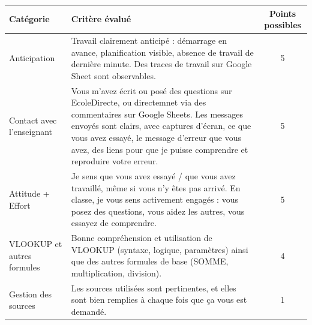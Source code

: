 \documentclass{exam}
\begin{document}
\renewcommand{\arraystretch}{1.7}
{
\centering
\begin{longtable}{|L{0.2\textwidth}|L{0.65\textwidth}|c|}
\hline
{}
\textbf{Catégorie} & \textbf{Critère évalué} & \textbf{Points possibles} \\[2pt]
\hline

Anticipation
& Travail clairement anticipé : démarrage en avance, planification visible, absence de travail de dernière minute. Des traces de travail sur Google Sheet sont observables.
& 5 \\
\hline

Contact avec l’enseignant
& Vous m'avez écrit ou posé des questions sur EcoleDirecte, ou directemnet via des commentaires sur Google Sheets. Les messages envoyés sont clairs, avec captures d'écran, ce que vous avez essayé, le message d'erreur que vous avez, des liens pour que je puisse comprendre et reproduire votre erreur.
& 5 \\
\hline

Attitude + Effort
& Je sens que vous avez essayé / que vous avez travaillé, même si vous n'y êtes pas arrivé. En classe, je vous sens activement engagés : vous posez des questions, vous aidez les autres, vous essayez de comprendre.
& 5 \\
\hline

VLOOKUP et autres formules
& Bonne compréhension et utilisation de VLOOKUP (syntaxe, logique, paramètres) ainsi que des autres formules de base (SOMME, multiplication, division).
& 4 \\
\hline

Gestion des sources
& Les sources utilisées sont pertinentes, et elles sont bien remplies à chaque fois que ça vous est demandé.
& 1 \\
\hline

\end{longtable}
}
\end{document}
